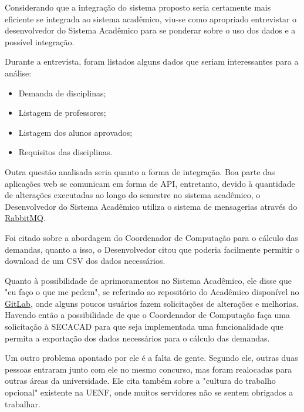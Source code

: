         Considerando que a integração do sistema proposto seria certamente mais eficiente se integrada ao sistema acadêmico, viu-se como apropriado entrevistar o desenvolvedor do Sistema Acadêmico para se ponderar sobre o uso dos dados e a possível integração.

        Durante a entrevista, foram listados alguns dados que seriam interessantes para a análise:

        \begin{itemize}
            \item Demanda de disciplinas;
            \item Listagem de professores;
            \item Listagem dos alunos aprovados;
            \item Requisitos das disciplinas.
        \end{itemize}


        Outra questão analisada seria quanto a forma de integração. Boa parte das aplicações web se comunicam em forma de API, entretanto, devido à quantidade de alterações executadas ao longo do semestre no sistema acadêmico, o Desenvolvedor do Sistema Acadêmico utiliza o sistema de mensagerias através do \href{https://www.rabbitmq.com/}{RabbitMQ}.

        Foi citado sobre a abordagem do Coordenador de Computação para o cálculo das demandas, quanto a isso, o Desenvolvedor citou que poderia facilmente permitir o download de um CSV dos dados necessários.

        Quanto à possibilidade de aprimoramentos no Sistema Acadêmico, ele disse que "eu faço o que me pedem", se referindo ao repositório do Acadêmico disponível no \href{https://about.gitlab.com/}{GitLab}, onde alguns poucos usuários fazem solicitações de alterações e melhorias. Havendo então a possibilidade de que o Coordenador de Computação faça uma solicitação à SECACAD para que seja implementada uma funcionalidade que permita a exportação dos dados necessários para o cálculo das demandas.

        Um outro problema apontado por ele é a falta de gente. Segundo ele, outras duas pessoas entraram junto com ele no mesmo concurso, mas foram realocadas para outras áreas da universidade. Ele cita também sobre a "cultura do trabalho opcional" existente na UENF, onde muitos servidores não se sentem obrigados a trabalhar.

